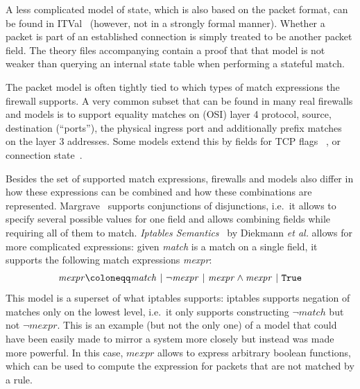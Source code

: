 A less complicated model of state, which is also based on the packet format, can be found in ITVal~\cite{marmorstein2005tool} (however, not in a strongly formal manner).
Whether a packet is part of an established connection is simply treated to be another packet field.
The theory files accompanying \cite{diekmann2015semantics} contain a proof that that model is not weaker than querying an internal state table when performing a stateful match.

The packet model is often tightly tied to which types of match expressions the firewall supports.
A very common subset that can be found in many real firewalls and models is to support equality matches on (OSI) layer 4 protocol, source, destination (``ports''), the physical ingress port and additionally prefix matches on the layer 3 addresses.
Some models extend this by fields for TCP flags~\cite{marmorstein2005tool,yuan2006fireman}%
, or connection state~\cite{brucker2007test,nelson2010margrave}.

Besides the set of supported match expressions, firewalls and models also differ in how these expressions can be combined and how these combinations are represented.
Margrave~\cite{nelson2010margrave} supports conjunctions of disjunctions, i.e.\ it allows to specify several possible values for one field and allows combining fields while requiring all of them to match.
\emph{Iptables Semantics}~\cite{diekmann2015semantics} by Diekmann \emph{et al.} allows for more complicated expressions:
given \emph{match} is a match on a single field, it supports the following match expressions \emph{mexpr}:
\begin{align}
	\mathit{mexpr} \coloneqq \mathit{match}~|~\neg\mathit{mexpr}~|~\mathit{mexpr}\wedge\mathit{mexpr}~|~\text{\texttt{True}}
\end{align}
This model is a superset of what iptables supports:
	iptables supports negation of matches only on the lowest level, i.e.\ it only supports constructing $\neg\mathit{match}$ but not $\neg\mathit{mexpr}$.
This is an example (but not the only one) of a model that could have been easily made to mirror a system more closely but instead was made more powerful.
In this case, $\mathit{mexpr}$ allows to express arbitrary boolean functions, which can be used to compute the expression for packets that are not matched by a rule.


